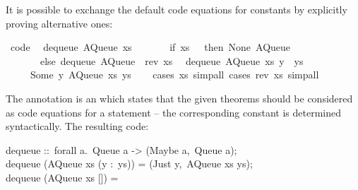 \begin{isabellebody}
\begin{isamarkuptext}
  It is possible to exchange the default code equations for constants
  by explicitly proving alternative ones:%
\end{isamarkuptext}%
\isamarkuptrue%
%
\isadelimquote
%
\endisadelimquote
%
\isatagquote
{}\isamarkupfalse%
\ {\isacharbrackleft}code{\isacharbrackright}{\isacharcolon}\isanewline
\ \ {\isachardoublequoteopen}dequeue\ {\isacharparenleft}AQueue\ xs\ {\isacharbrackleft}{\isacharbrackright}{\isacharparenright}\ {\isacharequal}\isanewline
\ \ \ \ \ {\isacharparenleft}if\ xs\ {\isacharequal}\ {\isacharbrackleft}{\isacharbrackright}\ then\ {\isacharparenleft}None{\isacharcomma}\ AQueue\ {\isacharbrackleft}{\isacharbrackright}\ {\isacharbrackleft}{\isacharbrackright}{\isacharparenright}\isanewline
\ \ \ \ \ \ \ else\ dequeue\ {\isacharparenleft}AQueue\ {\isacharbrackleft}{\isacharbrackright}\ {\isacharparenleft}rev\ xs{\isacharparenright}{\isacharparenright}{\isacharparenright}{\isachardoublequoteclose}\isanewline
\ \ {\isachardoublequoteopen}dequeue\ {\isacharparenleft}AQueue\ xs\ {\isacharparenleft}y\ {\isacharhash}\ ys{\isacharparenright}{\isacharparenright}\ {\isacharequal}\isanewline
\ \ \ \ \ {\isacharparenleft}Some\ y{\isacharcomma}\ AQueue\ xs\ ys{\isacharparenright}{\isachardoublequoteclose}\isanewline
\ \ \isamarkupfalse%
\ {\isacharparenleft}cases\ xs{\isacharcomma}\ simp{\isacharunderscore}all{\isacharparenright}\ {\isacharparenleft}cases\ {\isachardoublequoteopen}rev\ xs{\isachardoublequoteclose}{\isacharcomma}\ simp{\isacharunderscore}all{\isacharparenright}%
\endisatagquote
{\isafoldquote}%
%
\isadelimquote
%
\endisadelimquote
%
\begin{isamarkuptext}%
\noindent The annotation  is an 
  which states that the given theorems should be considered as code
  equations for a  statement -- the corresponding constant
  is determined syntactically.  The resulting code:%
\end{isamarkuptext}%
\isamarkuptrue%
%
\isadelimquote
%
\endisadelimquote
%
\isatagquote
%
\begin{isamarkuptext}%
\isatypewriter%
\noindent%
\hspace*{0pt}dequeue ::~forall a.~Queue a -> (Maybe a,~Queue a);\\
\hspace*{0pt}dequeue (AQueue xs (y :~ys)) = (Just y,~AQueue xs ys);\\
\hspace*{0pt}dequeue (AQueue xs []) =\\

\end{isamarkuptext}
\end{isabellebody}

